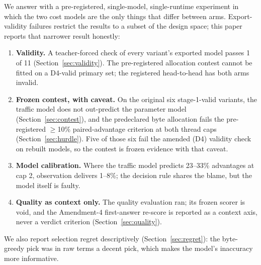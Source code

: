\documentclass[10pt,letterpaper,twocolumn]{article}
\begin{document}
We answer with a pre-registered, single-model, single-runtime
experiment in which the two cost models are the only things that
differ between arms. Export-validity failures restrict the
results to a subset of the design space; this paper reports
that narrower result honestly:
\begin{enumerate}
\item \textbf{Validity.} A teacher-forced check of every variant's
exported model passes 1 of 11 (Section~\ref{sec:validity}). The
pre-registered allocation contest cannot be fitted on a D4-valid
primary set; the registered head-to-head has both arms invalid.
\item \textbf{Frozen contest, with caveat.} On the original six
stage-1-valid variants, the traffic model does not out-predict the
parameter model (Section~\ref{sec:contest}), and the predeclared
byte allocation fails the pre-registered $\geq$10\% paired-advantage
criterion at both thread caps (Section~\ref{sec:hurdle}). Five of
those six fail the amended (D4) validity check on rebuilt models, so the contest is frozen evidence with that caveat.
\item \textbf{Model calibration.} Where the traffic model predicts
23--33\% advantages at cap 2, observation delivers 1--8\%; the
decision rule shares the blame, but the model itself is
faulty.
\item \textbf{Quality as context only.} The quality evaluation ran; its frozen scorer is void, and the Amendment-4 first-answer re-score is reported as a context axis, never a verdict criterion (Section~\ref{sec:quality}).
\end{enumerate}
We also report selection regret descriptively
(Section~\ref{sec:regret}): the byte-greedy pick was in raw terms a
decent pick, which makes the model's inaccuracy more informative.
\end{document}
